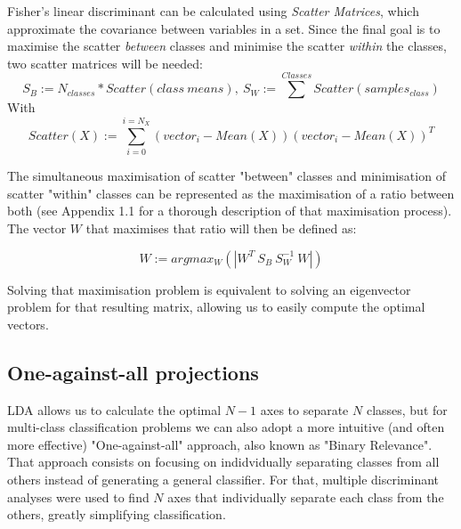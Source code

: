 \documentclass{bmvc2k}
\begin{document}
Fisher's linear discriminant can be calculated using \textit{Scatter Matrices}, which approximate the covariance between variables in a set\cite{fisherUt}. Since the final goal is to maximise the scatter \textit{between} classes and minimise the scatter \textit{within} the classes, two scatter matrices will be needed:
\begin{equation}\label{scatter}
   S_B := N_{classes}*Scatter(class\ means),\  
   S_W := \sum^{Classes}Scatter(samples_{class})
\end{equation}
With
\begin{equation}
   Scatter(X) := \sum_{i=0}^{i=N_X} (vector_i-Mean(X))(vector_i-Mean(X))^T
\end{equation}

The simultaneous maximisation of scatter "between" classes and minimisation of scatter "within" classes can be represented as the maximisation of a ratio between both (see Appendix 1.1 \cite{appendix} for a thorough description of that maximisation process). The vector $W$ that maximises that ratio will then be defined as:

\begin{equation}\label{eigen}
   W :=  argmax_W(|W^T\ S_B\ S_W^{-1}\ W|)
\end{equation}

Solving that maximisation problem is equivalent\cite{face} to solving an eigenvector problem for that resulting matrix, allowing us to easily compute the optimal vectors.

\subsection{One-against-all projections}

LDA allows us to calculate the optimal $N-1$ axes to separate $N$ classes, but for multi-class classification problems we can also adopt a more intuitive (and often more effective) "One-against-all" approach, also known as "Binary Relevance"\cite{binary}. That approach consists on focusing on indidvidually separating classes from all others instead of generating a general classifier. For that, multiple discriminant analyses were used to find $N$ axes that individually separate each class from the others, greatly simplifying classification.
\end{document}
